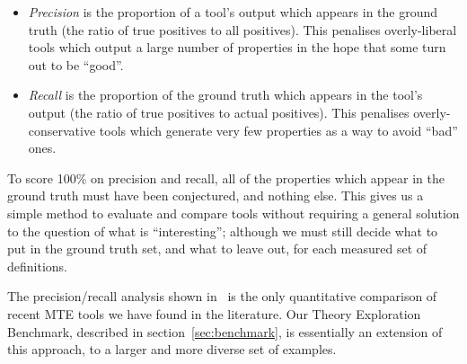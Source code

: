 \begin{itemize}
\item \emph{Precision} is the proportion of a tool's output which appears in
  the ground truth (the ratio of true positives to all positives). This
  penalises overly-liberal tools which output a large number of properties in
  the hope that some turn out to be ``good''.
\item \emph{Recall} is the proportion of the ground truth which appears in the
  tool's output (the ratio of true positives to actual positives). This
  penalises overly-conservative tools which generate very few properties as a
  way to avoid ``bad'' ones.
\end{itemize}

To score 100\% on precision and recall, all of the properties which appear in
the ground truth must have been conjectured, and nothing else. This gives us a
simple method to evaluate and compare tools without requiring a general solution
to the question of what is ``interesting''; although we must still decide what
to put in the ground truth set, and what to leave out, for each measured set of
definitions.

The precision/recall analysis shown in~\cite{claessen2013automating} is the only
quantitative comparison of recent MTE tools we have found in the literature.
Our Theory Exploration Benchmark, described in section~\ref{sec:benchmark}, is
essentially an extension of this approach, to a larger and more diverse set of
examples.



